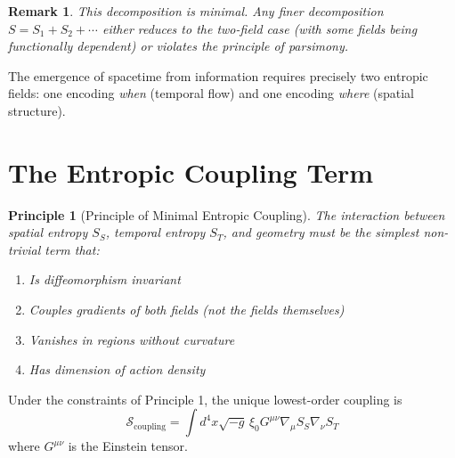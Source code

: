 \documentclass[12pt, a4paper]{article}
\newtheorem{principle}{Principle}[section]
\newtheorem*{remark}{Remark}
\begin{document}
\begin{remark}
This decomposition is minimal. Any finer decomposition $S = S_1 + S_2 + \cdots$ either reduces to the two-field case (with some fields being functionally dependent) or violates the principle of parsimony.
\end{remark}

\begin{corollary}
The emergence of spacetime from information requires precisely two entropic fields: one encoding \emph{when} (temporal flow) and one encoding \emph{where} (spatial structure).
\end{corollary}

\section{The Entropic Coupling Term}

\begin{principle}[Principle of Minimal Entropic Coupling]
The interaction between spatial entropy $S_S$, temporal entropy $S_T$, and geometry 
must be the simplest non-trivial term that:
\begin{enumerate}
    \item Is diffeomorphism invariant
    \item Couples gradients of both fields (not the fields themselves)
    \item Vanishes in regions without curvature
    \item Has dimension of action density
\end{enumerate}
\end{principle}

\begin{lemma}
Under the constraints of Principle 1, the unique lowest-order coupling is
\[
\mathcal{S}_{\text{coupling}} = \int d^4x \sqrt{-g}\, \xi_0 G^{\mu\nu} \nabla_\mu S_S \nabla_\nu S_T
\]
where $G^{\mu\nu}$ is the Einstein tensor.
\end{lemma}
\end{document}
